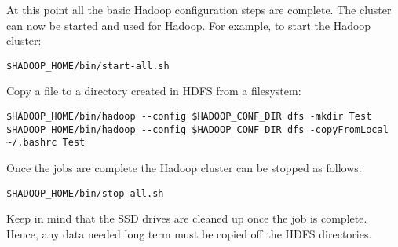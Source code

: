 At this point all the basic Hadoop configuration steps are complete.
The cluster can now be started and used for Hadoop. For example, to
start the Hadoop cluster:

\begin{verbatim}
$HADOOP_HOME/bin/start-all.sh
\end{verbatim}

Copy a file to a directory created in HDFS from a filesystem:

\begin{verbatim}
$HADOOP_HOME/bin/hadoop --config $HADOOP_CONF_DIR dfs -mkdir Test
$HADOOP_HOME/bin/hadoop --config $HADOOP_CONF_DIR dfs -copyFromLocal ~/.bashrc Test
\end{verbatim}

Once the jobs are complete the Hadoop cluster can be stopped as follows:

\begin{verbatim}
$HADOOP_HOME/bin/stop-all.sh
\end{verbatim}

Keep in mind that the SSD drives are cleaned up once the job is
complete. Hence, any data needed long term must be copied off the HDFS
directories.

